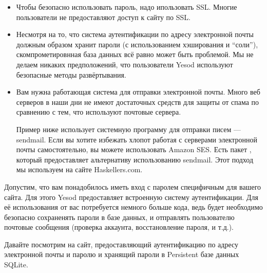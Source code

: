 \begin{itemize}
    \item Чтобы безопасно использовать пароль, надо ипользовать SSL. Многие пользователи не предоставляют доступ к сайту по SSL.

    \item Несмотря на то, что система аутентификации по адресу электронной почты должным образом хранит пароли (с использованием хэширования и ``соли''), скомпрометировнная база данных всё равно может быть проблемой. Мы не делаем никаких предположений, что пользователи Yesod используют безопасные методы развёртывания.

    \item Вам нужна работающая система для отправки электронной почты. Много веб серверов в наши дни не имеют достаточных средств для защиты от спама по сравнению с тем, что используют почтовые сервера.

    \begin{remark}
    Пример ниже использует системную программу для отправки писем --- sendmail. Если вы хотите избежать хлопот работая с серверами электронной почты самостоятельно, вы можете использовать Amazon SES. Есть пакет , который предоставляет альтернативу использованию sendmail. Этот подход мы используем на сайте Haskellers.com.
    \end{remark}
\end{itemize}

Допустим, что вам понадобилось иметь вход с паролем специфичным для вашего сайта. Для этого Yesod предоставляет встроенную систему аутентификации. Для её использования от вас потребуется немного больше кода, ведь будет необходимо безопасно сохраненять пароли в базе данных, и отправлять пользователю почтовые сообщения (проверка аккаунта, восстановление пароля, и т.д.).

Давайте посмотрим на сайт, предоставляющий аутентификацию по адресу электронной почты и паролю и хранящий пароли в Persistent базе данных SQLite.

